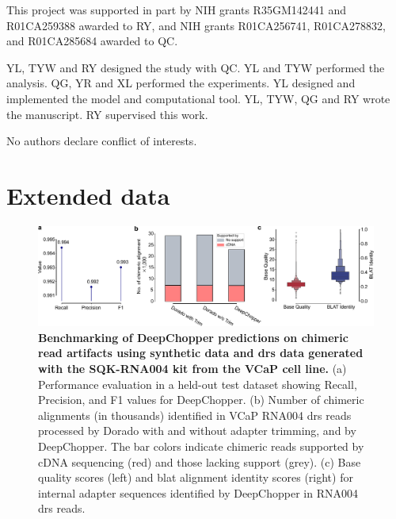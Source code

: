 \documentclass[pdflatex,sn-nature, lineno]{sn-jnl}%
\begin{document}

This project was supported in part by NIH grants R35GM142441 and R01CA259388 awarded to RY, and NIH grants R01CA256741, R01CA278832, and R01CA285684 awarded to QC.


YL, TYW and RY designed the study with QC. YL and TYW performed the analysis. QG, YR and XL performed the experiments. YL designed and implemented the model and computational tool. YL, TYW, QG and RY wrote the manuscript. RY supervised this work.


No authors declare conflict of interests.

\backmatter

\begin{appendices}
	\printglossaries
\end{appendices}



\newpage

\section{Extended data}

\renewcommand{\figurename}{Extended Data Fig.}


\begin{figure}[!ht]
	\includegraphics[height=0.29\columnwidth]{finals/sf1}
	\caption{ {\bf Benchmarking of DeepChopper predictions on chimeric read artifacts using synthetic data and \gls{drs} data generated with the SQK-RNA004 kit from the VCaP cell line.} (a) Performance evaluation in a held-out test dataset showing Recall, Precision, and F1 values for DeepChopper. (b) Number of chimeric alignments (in thousands) identified in VCaP RNA004 \gls{drs} reads processed by Dorado with and without adapter trimming, and by DeepChopper. The bar colors indicate chimeric reads supported by cDNA sequencing (red) and those lacking support (grey). (c) Base quality scores (left) and \gls{blat} alignment identity scores (right) for internal adapter sequences identified by DeepChopper in RNA004 \gls{drs} reads.}\label{fig:sf1}
\end{figure}
\end{document}
